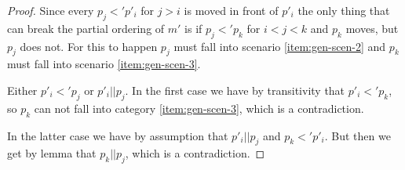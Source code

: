 \begin{definition}[Generalisation, $->g$]
\begin{proof}
    Since every $p_j <' p'_i$ for $j > i$ is moved in front of $p'_i$ the only
    thing that can break the partial ordering of $m'$ is if $p_j <' p_k$ for
    $i < j < k$ and $p_k$ moves, but $p_j$ does not. For this to happen $p_j$
    must fall into scenario \ref{item:gen-scen-2} and $p_k$ must fall into
    scenario \ref{item:gen-scen-3}.

    Either $p'_i <' p_j$ or $p'_i || p_j$. In the first case we have by
    transitivity that $p'_i <' p_k$, so $p_k$ can not fall into category
    \ref{item:gen-scen-3}, which is a contradiction.

    In the latter case we have by assumption that $p'_i || p_j$ and $p_k <'
    p'_i$. But then we get by lemma  that $p_k
    || p_j$, which is a contradiction.
  \end{proof}

\end{definition}

